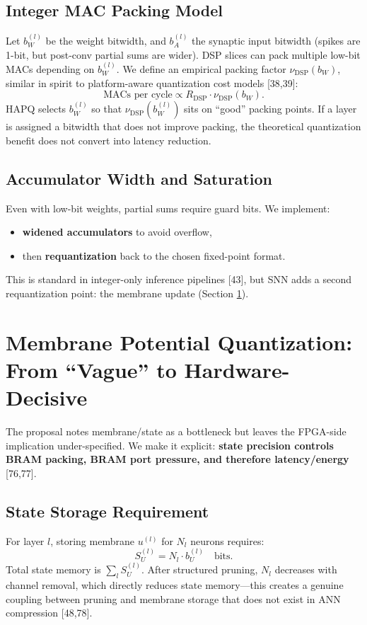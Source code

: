 \documentclass[10pt,journal,compsoc]{IEEEtran}
\begin{document}
\subsection{Integer MAC Packing Model}
Let $b_W^{(l)}$ be the weight bitwidth, and $b_A^{(l)}$ the synaptic input bitwidth (spikes are 1-bit, but post-conv partial sums are wider). DSP slices can pack multiple low-bit MACs depending on $b_W^{(l)}$. We define an empirical packing factor $\nu_{\text{DSP}}(b_W)$, similar in spirit to platform-aware quantization cost models [38,39]:
\begin{equation}
\text{MACs per cycle} \propto R_{\text{DSP}} \cdot \nu_{\text{DSP}}(b_W).
\end{equation}
HAPQ selects $b_W^{(l)}$ so that $\nu_{\text{DSP}}(b_W^{(l)})$ sits on ``good'' packing points. If a layer is assigned a bitwidth that does not improve packing, the theoretical quantization benefit does not convert into latency reduction.

\subsection{Accumulator Width and Saturation}
Even with low-bit weights, partial sums require guard bits. We implement:
\begin{itemize}
    \item \textbf{widened accumulators} to avoid overflow,
    \item then \textbf{requantization} back to the chosen fixed-point format.
\end{itemize}
This is standard in integer-only inference pipelines [43], but SNN adds a second requantization point: the membrane update (Section \ref{sec:membrane}).

\section{Membrane Potential Quantization: From ``Vague'' to Hardware-Decisive}
\label{sec:membrane}

The proposal notes membrane/state as a bottleneck but leaves the FPGA-side implication under-specified. We make it explicit: \textbf{state precision controls BRAM packing, BRAM port pressure, and therefore latency/energy} [76,77].

\subsection{State Storage Requirement}
For layer $l$, storing membrane $u^{(l)}$ for $N_l$ neurons requires:
\begin{equation}
S_U^{(l)} = N_l \cdot b_U^{(l)} \quad \text{bits}.
\end{equation}
Total state memory is $\sum_l S_U^{(l)}$. After structured pruning, $N_l$ decreases with channel removal, which directly reduces state memory---this creates a genuine coupling between pruning and membrane storage that does not exist in ANN compression [48,78].
\end{document}
